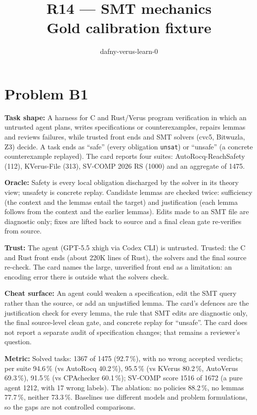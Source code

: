 \documentclass[11pt]{article}
\title{R14 --- SMT mechanics \\ \large Gold calibration fixture}
\author{dafny-verus-learn-0}
\date{}
\begin{document}
\maketitle
\section*{Problem B1}\label{ans:B1}
\begin{answer}
\textbf{Task shape:} A harness for C and Rust/Verus program verification in which an untrusted agent plans, writes specifications or counterexamples, repairs lemmas and reviews failures, while trusted front ends and SMT solvers (cvc5, Bitwuzla, Z3) decide. A task ends as ``safe'' (every obligation \texttt{unsat}) or ``unsafe'' (a concrete counterexample replayed). The card reports four suites: AutoRocq-ReachSafety (112), KVerus-File (313), SV-COMP 2026 RS (1000) and an aggregate of 1475.

\textbf{Oracle:} Safety is every local obligation discharged by the solver in its theory view; unsafety is concrete replay. Candidate lemmas are checked twice: sufficiency (the context and the lemmas entail the target) and justification (each lemma follows from the context and the earlier lemmas). Edits made to an SMT file are diagnostic only; fixes are lifted back to source and a final clean gate re-verifies from source.

\textbf{Trust:} The agent (GPT-5.5 xhigh via Codex CLI) is untrusted. Trusted: the C and Rust front ends (about 220K lines of Rust), the solvers and the final source re-check. The card names the large, unverified front end as a limitation: an encoding error there is outside what the solvers check.

\textbf{Cheat surface:} An agent could weaken a specification, edit the SMT query rather than the source, or add an unjustified lemma. The card's defences are the justification check for every lemma, the rule that SMT edits are diagnostic only, the final source-level clean gate, and concrete replay for ``unsafe''. The card does not report a separate audit of specification changes; that remains a reviewer's question.

\textbf{Metric:} Solved tasks: 1367 of 1475 (92.7\,\%), with no wrong accepted verdicts; per suite 94.6\,\% (vs AutoRocq 40.2\,\%), 95.5\,\% (vs KVerus 80.2\,\%, AutoVerus 69.3\,\%), 91.5\,\% (vs CPAchecker 60.1\,\%); SV-COMP score 1516 of 1672 (a pure agent 1212, with 17 wrong labels). The ablation: no policies 88.2\,\%, no lemmas 77.7\,\%, neither 73.3\,\%. Baselines use different models and problem formulations, so the gaps are not controlled comparisons.


\end{answer}
\end{document}
